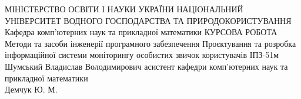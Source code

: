 \documentclass[14pt,a4paper]{extarticle}
\begin{document}
    \maketitlepage
    {МІНІСТЕРСТВО ОСВІТИ І НАУКИ УКРАЇНИ}
    {НАЦІОНАЛЬНИЙ УНІВЕРСИТЕТ ВОДНОГО ГОСПОДАРСТВА ТА ПРИРОДОКОРИСТУВАННЯ}
    {Кафедра комп’ютерних наук та прикладної математики}
    {КУРСОВА РОБОТА}
    {Методи та засоби інженерії програмного забезпечення}
    {Проєктування та розробка інформаційної системи моніторингу особистих звичок користувачів}
    {ІПЗ-51м}
    {Шумський Владислав Володимирович}
    {асистент кафедри комп’ютерних наук та прикладної математики \\ Демчук Ю. М.}

    \newpage
    \setcounter{page}{2}
    \pagestyle{fancy}
    \tableofcontents

    
    
    
    
    
    
    
\end{document}
